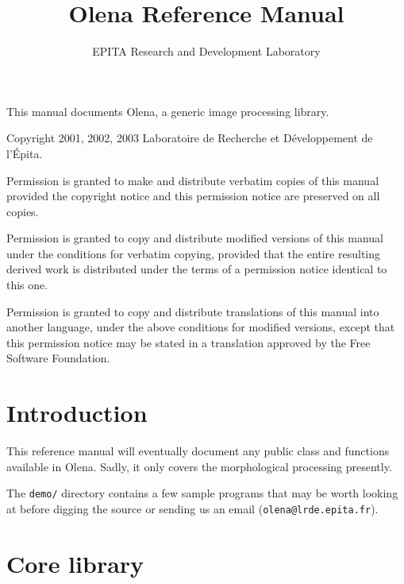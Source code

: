\documentclass{book}
\newcommand\var\textit
\begin{document}
\title{Olena Reference Manual}
\author{EPITA Research and Development Laboratory}
\maketitle


This manual documents Olena, a generic image processing library.

Copyright 2001, 2002, 2003  Laboratoire de Recherche et D\'eveloppement de l'\'Epita.

Permission is granted to make and distribute verbatim
copies of this manual provided the copyright notice and
this permission notice are preserved on all copies.


Permission is granted to copy and distribute modified versions of this
manual under the conditions for verbatim copying, provided that the
entire resulting derived work is distributed under the terms of a
permission notice identical to this one.

Permission is granted to copy and distribute
translations of this manual into another language,
under the above conditions for modified versions,
except that this permission notice may be stated in a
translation approved by the Free Software Foundation.

\newpage

\chapter{Introduction}

This reference manual will eventually document any public class and
functions available in Olena.  Sadly, it only covers the morphological
processing presently.

The \texttt{demo/} directory contains a few sample programs that may be
worth looking at before digging the source or sending us an email
(\texttt{olena@lrde.epita.fr}).


\chapter{Core library}
\end{document}
